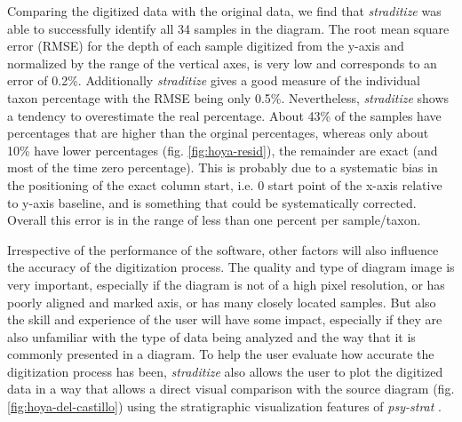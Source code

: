 \documentclass[
11pt, %
english, %
singlespacing, %
headsepline, %
]{MastersDoctoralThesis} %
\begin{document}
\begin{NoHyper}
\begin{refsection}
Comparing the digitized data with the original data, we find that \emph{straditize} was able to successfully identify all 34 samples in the diagram. The root mean square error (RMSE) for the depth of each sample digitized from the y-axis and normalized by the range of the vertical axes, is very low and corresponds to an error of 0.2\%. Additionally \emph{straditize} gives a good measure of the individual taxon percentage with the RMSE being only 0.5\%. Nevertheless, \emph{straditize} shows a tendency to overestimate the real percentage. About 43\% of the samples have percentages that are higher than the orginal percentages, whereas only about 10\% have lower percentages (fig. \ref{fig:hoya-resid}), the remainder are exact (and most of the time zero percentage). This is probably due to a systematic bias in the positioning of the exact column start, i.e. 0 start point of the x-axis relative to y-axis baseline, and is something that could be systematically corrected. Overall this error is in the range of less than one percent per sample/taxon.

Irrespective of the performance of the software, other factors will also influence the accuracy of the digitization process. The quality and type of diagram image is very important, especially if the diagram is not of a high pixel resolution, or has poorly aligned and marked axis, or has many closely located samples. But also the skill and experience of the user will have some impact, especially if they are also unfamiliar with the type of data being analyzed and the way that it is commonly presented in a diagram. To help the user evaluate how accurate the digitization process has been, \emph{straditize} also allows the user to plot the digitized data in a way that allows a direct visual comparison with the source diagram (fig. \ref{fig:hoya-del-castillo}) using the stratigraphic visualization features of \textit{psy-strat} \citep{Sommer2019}.


\end{refsection}
\end{NoHyper}
\end{document}
